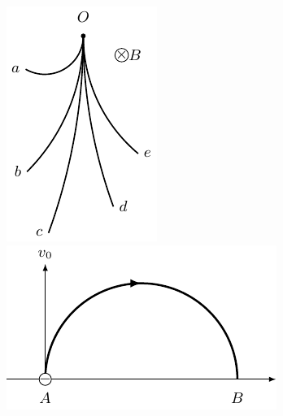\begin{enumerate}
\begin{figure}[htbp]
    \centering
    \begin{minipage}[t]{0.48\textwidth}
        \centering
        \includegraphics{fig/C/1-45.pdf}
        \caption{}\label{fig_C_1-45}
    \end{minipage}
    \begin{minipage}[t]{0.48\textwidth}
        \centering
        \includegraphics{fig/C/1-46.pdf}
        \caption{}\label{fig_C_1-46}
    \end{minipage}
\end{figure}



\end{enumerate}
